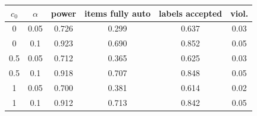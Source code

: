 \begin{tabular}{cccccc}
\toprule
$c_0$ & $\alpha$ & power & items fully auto & labels accepted & viol. \\
\midrule
0 & 0.05 & 0.726 & 0.299 & 0.637 & 0.03 \\
0 & 0.1 & 0.923 & 0.690 & 0.852 & 0.05 \\
0.5 & 0.05 & 0.712 & 0.365 & 0.625 & 0.03 \\
0.5 & 0.1 & 0.918 & 0.707 & 0.848 & 0.05 \\
1 & 0.05 & 0.700 & 0.381 & 0.614 & 0.02 \\
1 & 0.1 & 0.912 & 0.713 & 0.842 & 0.05 \\
\bottomrule
\end{tabular}

